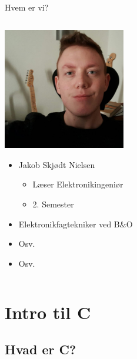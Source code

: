 \documentclass{beamer}
\begin{document}
\begin{frame}{Hvem er vi?}
\begin{columns}
		\begin{column}{0.5\textwidth}
		\begin{center}
			\includegraphics[width=0.4\textwidth]{assets/jakob_sn.jpg}
		\end{center}
		\begin{itemize}
		\item{Jakob Skjødt Nielsen}
			\begin{itemize}
			\item{Læser Elektronikingeniør}
			\item{2. Semester}
			\end{itemize}
		\item{Elektronikfagtekniker ved B\&O}
		\item{Osv.}
		\item{Osv.}
		\end{itemize}
		\end{column}
		
	\end{columns}
\end{frame}

\section{Intro til C}
\subsection{Hvad er C?}
\end{document}
